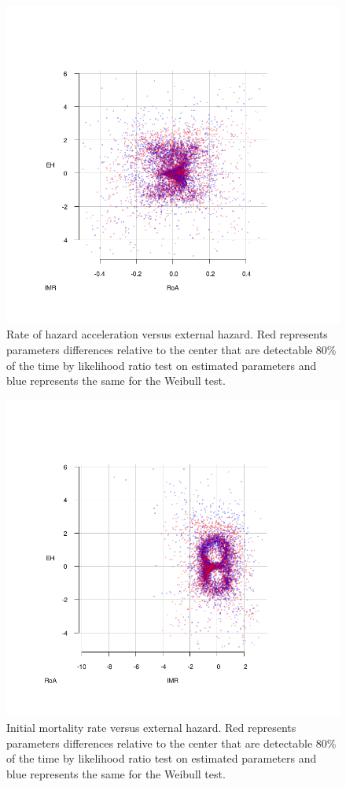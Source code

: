 \documentclass[review, authoryear]{elsarticle}
\begin{document}
\begin{figure}
\centering
\includegraphics[width=1.00000\textwidth]{eh_vs_roa.png}
\caption{Rate of hazard acceleration versus external hazard. Red
represents parameters differences relative to the center that are
detectable 80\% of the time by likelihood ratio test on estimated
parameters and blue represents the same for the Weibull test.}
\end{figure}

\begin{figure}
\centering
\includegraphics[width=1.00000\textwidth]{eh_vs_imr.png}
\caption{Initial mortality rate versus external hazard. Red represents
parameters differences relative to the center that are detectable 80\%
of the time by likelihood ratio test on estimated parameters and blue
represents the same for the Weibull test.}
\end{figure}
\end{document}
